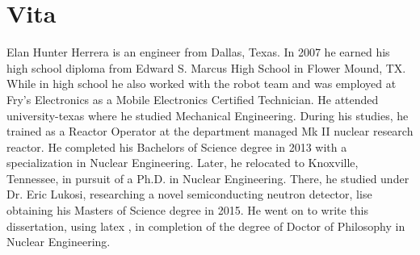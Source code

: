 \documentclass[../main.tex]{subfiles}
\begin{document}
%
    \chapter*{Vita}%
    Elan Hunter Herrera is an engineer from Dallas, Texas.
    In 2007 he earned his high school diploma from Edward S. Marcus High School in Flower Mound, TX. 
    While in high school he also worked with the robot team and was employed at Fry’s Electronics as a Mobile Electronics Certified Technician. 
    He attended \gls{university-texas} where he studied Mechanical Engineering. 
    During his studies, he trained as a Reactor Operator at the department managed  Mk II nuclear research reactor.
    He completed his Bachelors of Science degree in 2013 with a specialization in Nuclear Engineering. 
    \FloatBarrier%
    Later, he relocated to Knoxville, Tennessee, in pursuit of a Ph.D. in Nuclear Engineering. 
    There, he studied under Dr. Eric Lukosi, researching a novel semiconducting neutron detector, \gls{lise} \cite{Lukosi_2014,Stowe_2014,Hamm_2015,Lukosi_2016a,Herrera_2016,Lukosi_2017,Herrera_2018,Hamm_2018} obtaining his Masters of Science degree in 2015. 
    He went on to write this dissertation, using \gls{latex} \cite{book:Mittelbach_2004}, in completion of the degree of Doctor of Philosophy in Nuclear Engineering.
\end{document}
